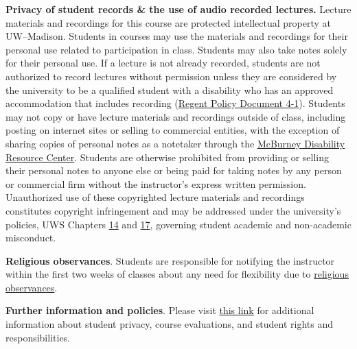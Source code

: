\documentclass[11pt]{article}
\begin{document}
\textbf{Privacy of student records \& the use of audio recorded lectures.} Lecture materials and recordings for this course are protected intellectual property at UW--Madison. Students in courses may use the materials and recordings for their personal use related to participation in class. Students may also take notes solely for their personal use. If a lecture is not already recorded, students are not authorized to record lectures without permission unless they are considered by the university to be a qualified student with a disability who has an approved accommodation that includes recording (\href{https://www.wisconsin.edu/regents/policies/recording-of-lectures/}{Regent Policy Document 4-1}).
Students may not copy or have lecture materials and recordings outside of class, including posting on internet sites or selling to commercial entities, with the exception of sharing copies of personal notes as a notetaker through the \href{https://mcburney.wisc.edu/}{McBurney Disability Resource Center}. 
Students are otherwise prohibited from providing or selling their personal notes to anyone else or being paid for taking notes by any person or commercial firm without the instructor’s express written permission. 
Unauthorized use of these copyrighted lecture materials and recordings constitutes copyright infringement and may be addressed under the university’s policies, UWS Chapters \href{https://docs.legis.wisconsin.gov/code/admin_code/uws/14}{14} and \href{https://docs.legis.wisconsin.gov/code/admin_code/uws/17}{17}, governing student academic and non-academic misconduct.

\textbf{Religious observances}. Students are responsible for notifying the instructor within the first two weeks of classes about any need for flexibility due to \href{https://policy.wisc.edu/library/UW-880}{religious observances}.

\textbf{Further information and policies}. Please visit \href{https://guide.wisc.edu/courses/#SyllabusStatements}{this link} for additional information about student privacy, course evaluations, and student rights and responsibilities. 
\end{document}
